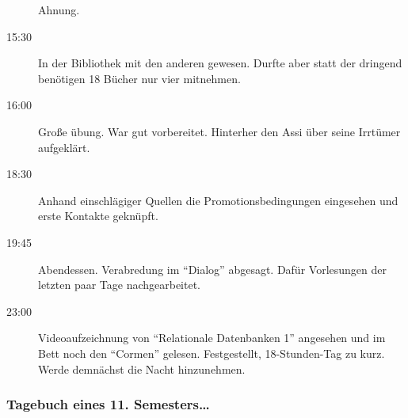 \begin{multicols}{2}
\begin{description}
Ahnung.
\item[15:30] In der Bibliothek mit den anderen gewesen. Durfte aber statt der
dringend benötigen 18 Bücher nur vier mitnehmen.
\item[16:00] Große übung. War gut vorbereitet. Hinterher den Assi über seine
Irrtümer aufgeklärt.
\item[18:30] Anhand einschlägiger Quellen die Promotionsbedingungen eingesehen und
erste Kontakte geknüpft.
\item[19:45] Abendessen. Verabredung im "`Dialog"' abgesagt. Dafür Vorlesungen
der letzten paar Tage nachgearbeitet.
\item[23:00] Videoaufzeichnung von "`Relationale Datenbanken 1"' angesehen und im Bett noch den "`Cormen"'
gelesen. Festgestellt, 18-Stunden-Tag zu kurz. Werde demnächst die Nacht
hinzunehmen.
\end{description}
\newpage
\subsubsection{Tagebuch eines 11. Semesters\ldots}


\end{multicols}
